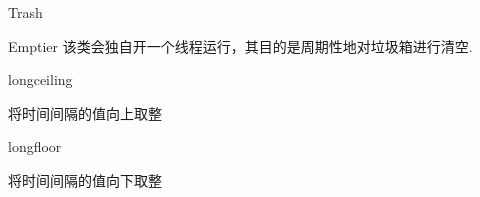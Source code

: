 \begin{XeClass}{Trash}
\begin{XeInnerClass}{Emptier}
 该类会独自开一个线程运行，其目的是周期性地对垃圾箱进行清空.

        \begin{XeMethod}{\XePrivate}{long}{ceiling}
             
 将时间间隔的值向上取整

        \end{XeMethod}

        \begin{XeMethod}{\XePrivate}{long}{floor}
             
 将时间间隔的值向下取整

        \end{XeMethod}

    \end{XeInnerClass}
\end{XeClass}
